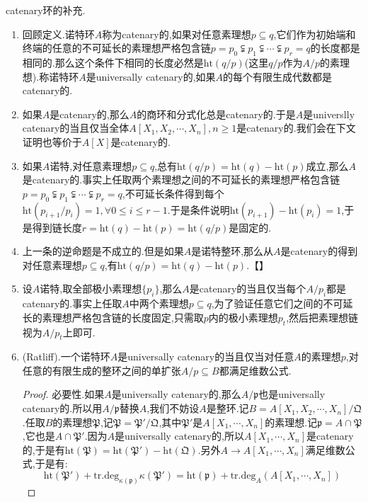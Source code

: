 catenary环的补充.
\begin{enumerate}
	\item 回顾定义.诺特环$A$称为catenary的,如果对任意素理想$p\subseteq q$,它们作为初始端和终端的任意的不可延长的素理想严格包含链$p=p_0\subsetneqq p_1\subsetneqq\cdots\subsetneqq p_r=q$的长度都是相同的.那么这个条件下相同的长度必然是$\mathrm{ht}(q/p)$(这里$q/p$作为$A/p$的素理想).称诺特环$A$是universally catenary的,如果$A$的每个有限生成代数都是catenary的.
	\item 如果$A$是catenary的,那么$A$的商环和分式化总是catenary的.于是$A$是universlly catenary的当且仅当全体$A[X_1,X_2,\cdots,X_n],n\ge1$是catenary的.我们会在下文证明也等价于$A[X]$是catenary的.
	\item 如果$A$诺特,对任意素理想$p\subseteq q$,总有$\mathrm{ht}(q/p)=\mathrm{ht}(q)-\mathrm{ht}(p)$成立,那么$A$是catenary的.事实上任取两个素理想之间的不可延长的素理想严格包含链$p=p_0\subsetneqq p_1\subsetneqq\cdots\subsetneqq p_r=q$,不可延长条件得到每个$\mathrm{ht}(p_{i+1}/p_i)=1,\forall 0\le i\le r-1$.于是条件说明$\mathrm{ht}(p_{i+1})-\mathrm{ht}(p_i)=1$,于是得到链长度$r=\mathrm{ht}(q)-\mathrm{ht}(p)=\mathrm{ht}(q/p)$是固定的.
	\item 上一条的逆命题是不成立的.但是如果$A$是诺特整环,那么从$A$是catenary的得到对任意素理想$p\subseteq q$,有$\mathrm{ht}(q/p)=\mathrm{ht}(q)-\mathrm{ht}(p)$.【】
	\item 设$A$诺特,取全部极小素理想$\{p_i\}$,那么$A$是catenary的当且仅当每个$A/p_i$都是catenary的.事实上任取$A$中两个素理想$p\subseteq q$,为了验证任意它们之间的不可延长的素理想严格包含链的长度固定,只需取$p$内的极小素理想$p_t$,然后把素理想链视为$A/p_t$上即可.
	\item (Ratliff).一个诺特环$A$是universally catenary的当且仅当对任意$A$的素理想$p$,对任意的有限生成的整环之间的单扩张$A/p\subseteq B$都满足维数公式.
	\begin{proof}
		
		必要性.如果$A$是universally catenary的,那么$A/\mathfrak{p}$也是universally catenary的.所以用$A/\mathfrak{p}$替换$A$,我们不妨设$A$是整环.记$B=A[X_1,X_2,\cdots,X_n]/\mathfrak{Q}$.任取$B$的素理想$\mathfrak{P}$,记$\mathfrak{P}=\mathfrak{P}'/\mathfrak{Q}$,其中$\mathfrak{P}'$是$A[X_1,\cdots,X_n]$的素理想.记$\mathfrak{p}=A\cap\mathfrak{P}$,它也是$A\cap\mathfrak{P}'$.因为$A$是universally catenary的,所以$A[X_1,\cdots,X_n]$是catenary的,于是有$\mathrm{ht}(\mathfrak{P})=\mathrm{ht}(\mathfrak{P}')-\mathrm{ht}(\mathfrak{Q})$.另外$A\to A[X_1,\cdots,X_n]$满足维数公式,于是有:
		$$\mathrm{ht}(\mathfrak{P}')+\mathrm{tr.deg}_{\kappa(\mathfrak{p})}\kappa(\mathfrak{P}')=\mathrm{ht}(\mathfrak{p})+\mathrm{tr.deg}_A(A[X_1,\cdots,X_n])$$
		

\end{proof}
\end{enumerate}
